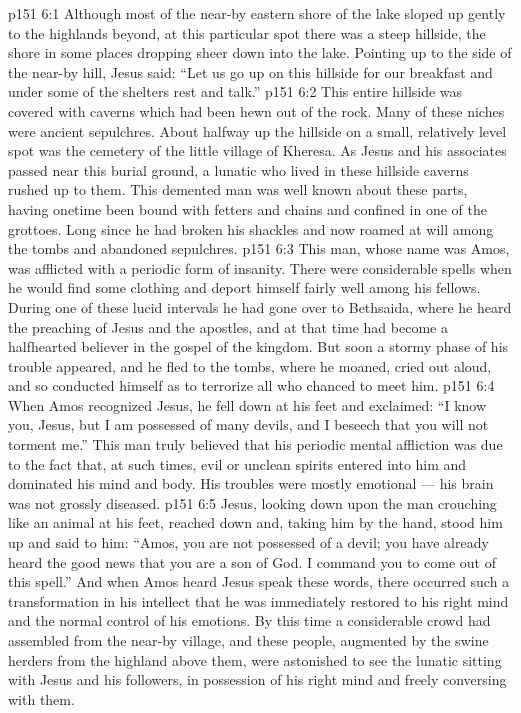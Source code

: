 \vs p151 6:1 Although most of the near\hyp{}by eastern shore of the lake sloped up gently to the highlands beyond, at this particular spot there was a steep hillside, the shore in some places dropping sheer down into the lake. Pointing up to the side of the near\hyp{}by hill, Jesus said: \textcolor{ubdarkred}{“Let us go up on this hillside for our breakfast and under some of the shelters rest and talk.”}
\vs p151 6:2 This entire hillside was covered with caverns which had been hewn out of the rock. Many of these niches were ancient sepulchres. About halfway up the hillside on a small, relatively level spot was the cemetery of the little village of Kheresa. As Jesus and his associates passed near this burial ground, a lunatic who lived in these hillside caverns rushed up to them. This demented man was well known about these parts, having onetime been bound with fetters and chains and confined in one of the grottoes. Long since he had broken his shackles and now roamed at will among the tombs and abandoned sepulchres.
\vs p151 6:3 This man, whose name was Amos, was afflicted with a periodic form of insanity. There were considerable spells when he would find some clothing and deport himself fairly well among his fellows. During one of these lucid intervals he had gone over to Bethsaida, where he heard the preaching of Jesus and the apostles, and at that time had become a halfhearted believer in the gospel of the kingdom. But soon a stormy phase of his trouble appeared, and he fled to the tombs, where he moaned, cried out aloud, and so conducted himself as to terrorize all who chanced to meet him.
\vs p151 6:4 When Amos recognized Jesus, he fell down at his feet and exclaimed: “I know you, Jesus, but I am possessed of many devils, and I beseech that you will not torment me.” This man truly believed that his periodic mental affliction was due to the fact that, at such times, evil or unclean spirits entered into him and dominated his mind and body. His troubles were mostly emotional --- his brain was not grossly diseased.
\vs p151 6:5 Jesus, looking down upon the man crouching like an animal at his feet, reached down and, taking him by the hand, stood him up and said to him: \textcolor{ubdarkred}{“Amos, you are not possessed of a devil; you have already heard the good news that you are a son of God. I command you to come out of this spell.”} And when Amos heard Jesus speak these words, there occurred such a transformation in his intellect that he was immediately restored to his right mind and the normal control of his emotions. By this time a considerable crowd had assembled from the near\hyp{}by village, and these people, augmented by the swine herders from the highland above them, were astonished to see the lunatic sitting with Jesus and his followers, in possession of his right mind and freely conversing with them.
